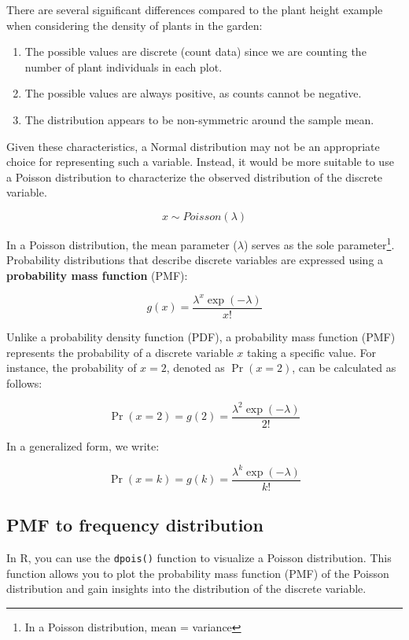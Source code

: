 \documentclass[
]{book}
\begin{document}
There are several significant differences compared to the plant height example when considering the density of plants in the garden:

\begin{enumerate}
\def\labelenumi{\arabic{enumi}.}
\item
  The possible values are discrete (count data) since we are counting the number of plant individuals in each plot.
\item
  The possible values are always positive, as counts cannot be negative.
\item
  The distribution appears to be non-symmetric around the sample mean.
\end{enumerate}

Given these characteristics, a Normal distribution may not be an appropriate choice for representing such a variable. Instead, it would be more suitable to use a Poisson distribution to characterize the observed distribution of the discrete variable.

\[
x \sim Poisson(\lambda)
\]

In a Poisson distribution, the mean parameter (\(\lambda\)) serves as the sole parameter\footnote{In a Poisson distribution, mean = variance}. Probability distributions that describe discrete variables are expressed using a \textbf{probability mass function} (PMF):

\[
g(x) = \frac{\lambda^x \exp(-\lambda)}{x!}
\]

Unlike a probability density function (PDF), a probability mass function (PMF) represents the probability of a discrete variable \(x\) taking a specific value. For instance, the probability of \(x=2\), denoted as \(\Pr(x=2)\), can be calculated as follows:

\[
\Pr(x=2) = g(2) = \frac{\lambda^2 \exp(-\lambda)}{2!}
\]

In a generalized form, we write:

\[
\Pr(x=k) = g(k) = \frac{\lambda^k \exp(-\lambda)}{k!}
\]

\hypertarget{pmf-to-frequency-distribution}{%
\subsection{PMF to frequency distribution}\label{pmf-to-frequency-distribution}}

In R, you can use the \texttt{dpois()} function to visualize a Poisson distribution. This function allows you to plot the probability mass function (PMF) of the Poisson distribution and gain insights into the distribution of the discrete variable.
\end{document}
